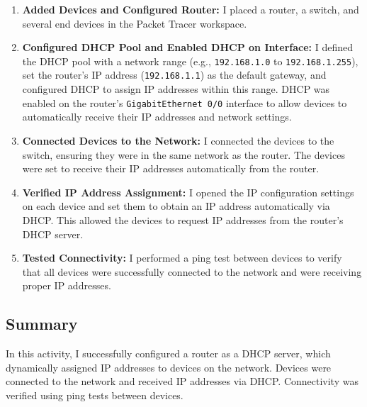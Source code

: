\documentclass[11pt,a4paper]{article}
\let\oldincludegraphics\includegraphics
\renewcommand{\includegraphics}[2][]{%
  \begin{center}
    \oldincludegraphics[#1]{#2}
  \end{center}
}
\begin{document}
\begin{enumerate}
\item \textbf{Added Devices and Configured Router:} I placed a router, a switch, and several end devices in the Packet Tracer workspace.


\item \textbf{Configured DHCP Pool and Enabled DHCP on Interface:} I defined the DHCP pool with a network range (e.g., \texttt{192.168.1.0} to \texttt{192.168.1.255}), set the router’s IP address (\texttt{192.168.1.1}) as the default gateway, and configured DHCP to assign IP addresses within this range. DHCP was enabled on the router's \texttt{GigabitEthernet 0/0} interface to allow devices to automatically receive their IP addresses and network settings.


\item \textbf{Connected Devices to the Network:} I connected the devices to the switch, ensuring they were in the same network as the router. The devices were set to receive their IP addresses automatically from the router.


\item \textbf{Verified IP Address Assignment:} I opened the IP configuration settings on each device and set them to obtain an IP address automatically via DHCP. This allowed the devices to request IP addresses from the router’s DHCP server.


\item \textbf{Tested Connectivity:} I performed a ping test between devices to verify that all devices were successfully connected to the network and were receiving proper IP addresses.

\end{enumerate}

\subsection{Summary}

In this activity, I successfully configured a router as a DHCP server, which dynamically assigned IP addresses to devices on the network. Devices were connected to the network and received IP addresses via DHCP. Connectivity was verified using ping tests between devices.
\end{document}
